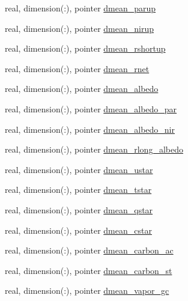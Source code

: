 \begin{DoxyCompactItemize}
real, dimension(\+:), pointer \hyperlink{structed__state__vars_1_1sitetype_a7a18b3869d69e371228956ded6c084db}{dmean\+\_\+parup}
\item 
real, dimension(\+:), pointer \hyperlink{structed__state__vars_1_1sitetype_a03476f6b55cd3c60449ddabed7d06be9}{dmean\+\_\+nirup}
\item 
real, dimension(\+:), pointer \hyperlink{structed__state__vars_1_1sitetype_aad339cc8b7096d5cdb027ec9a9f0a578}{dmean\+\_\+rshortup}
\item 
real, dimension(\+:), pointer \hyperlink{structed__state__vars_1_1sitetype_a81aa527a51d77ade6a4e32ec21c0ab69}{dmean\+\_\+rnet}
\item 
real, dimension(\+:), pointer \hyperlink{structed__state__vars_1_1sitetype_a2db2994c6b3b5d10a7f883ba0e264f42}{dmean\+\_\+albedo}
\item 
real, dimension(\+:), pointer \hyperlink{structed__state__vars_1_1sitetype_ab01e9b6cec7d540ac59be6ebc6bb79c4}{dmean\+\_\+albedo\+\_\+par}
\item 
real, dimension(\+:), pointer \hyperlink{structed__state__vars_1_1sitetype_a6549f1eed76239998cbcf443d70c04fb}{dmean\+\_\+albedo\+\_\+nir}
\item 
real, dimension(\+:), pointer \hyperlink{structed__state__vars_1_1sitetype_ad2d343abc14c1e0dbf98300e60aeefce}{dmean\+\_\+rlong\+\_\+albedo}
\item 
real, dimension(\+:), pointer \hyperlink{structed__state__vars_1_1sitetype_a591a2f3dfa4a19b7116205958a461879}{dmean\+\_\+ustar}
\item 
real, dimension(\+:), pointer \hyperlink{structed__state__vars_1_1sitetype_af83dc5b8b1643f24aa1e0130f1e78e17}{dmean\+\_\+tstar}
\item 
real, dimension(\+:), pointer \hyperlink{structed__state__vars_1_1sitetype_a6cc902376e1ac8e836c9d018b0f25469}{dmean\+\_\+qstar}
\item 
real, dimension(\+:), pointer \hyperlink{structed__state__vars_1_1sitetype_a08344f5fa282db761f7cb0efd84d2c6f}{dmean\+\_\+cstar}
\item 
real, dimension(\+:), pointer \hyperlink{structed__state__vars_1_1sitetype_acf3a9ac97c531535306f75231fc6118c}{dmean\+\_\+carbon\+\_\+ac}
\item 
real, dimension(\+:), pointer \hyperlink{structed__state__vars_1_1sitetype_a6931714c947355edfa3663d1c55b9221}{dmean\+\_\+carbon\+\_\+st}
\item 
real, dimension(\+:), pointer \hyperlink{structed__state__vars_1_1sitetype_a3b4b85926bd1bfa4945b6c16422cecc5}{dmean\+\_\+vapor\+\_\+gc}

\end{DoxyCompactItemize}
